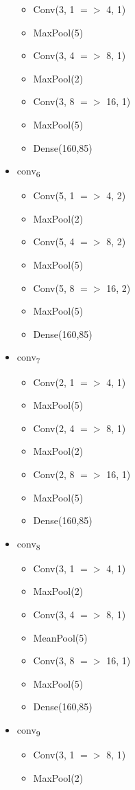 \documentclass[12pt]{article}
\begin{document}
\begin{itemize}
\begin{itemize}
		\item Conv(3, 1 $=>$ 4, 1)
  		\item MaxPool(5)
		\item Conv(3, 4 $=>$ 8, 1)
		\item MaxPool(2)
		\item Conv(3, 8 $=>$ 16, 1)
		\item MaxPool(5)
  		\item Dense(160,85)
	\end{itemize}
	\item conv\textsubscript{6} \begin{itemize}
		\item Conv(5, 1 $=>$ 4, 2)
  		\item MaxPool(2)
		\item Conv(5, 4 $=>$ 8, 2)
		\item MaxPool(5)
		\item Conv(5, 8 $=>$ 16, 2)
		\item MaxPool(5)
  		\item Dense(160,85)
	\end{itemize}
	\item conv\textsubscript{7} \begin{itemize}
		\item Conv(2, 1 $=>$ 4, 1)
  		\item MaxPool(5)
		\item Conv(2, 4 $=>$ 8, 1)
		\item MaxPool(2)
		\item Conv(2, 8 $=>$ 16, 1)
		\item MaxPool(5)
  		\item Dense(160,85)
	\end{itemize}
	\item conv\textsubscript{8} \begin{itemize}
		\item Conv(3, 1 $=>$ 4, 1)
  		\item MaxPool(2)
		\item Conv(3, 4 $=>$ 8, 1)
		\item MeanPool(5)
		\item Conv(3, 8 $=>$ 16, 1)
		\item MaxPool(5)
  		\item Dense(160,85)
	\end{itemize}
	\item conv\textsubscript{9} \begin{itemize}
		\item Conv(3, 1 $=>$ 8, 1)
  		\item MaxPool(2)

\end{itemize}
\end{itemize}
\end{document}
